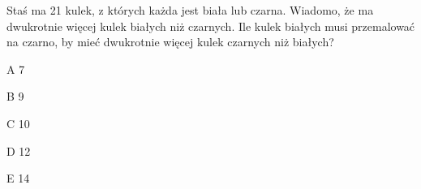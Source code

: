 \begin{tresc}
Staś ma 21 kulek, z których każda jest biała lub czarna. Wiadomo, że ma dwukrotnie więcej kulek białych niż czarnych. Ile kulek białych musi przemalować na czarno, by mieć dwukrotnie więcej kulek czarnych niż białych?
\end{tresc}
\begin{wariant}{A} 7 \end{wariant}
\begin{wariant}{B} 9 \end{wariant}
\begin{wariant}{C} 10 \end{wariant}
\begin{wariant}{D} 12 \end{wariant}
\begin{wariant}{E} 14 \end{wariant}
